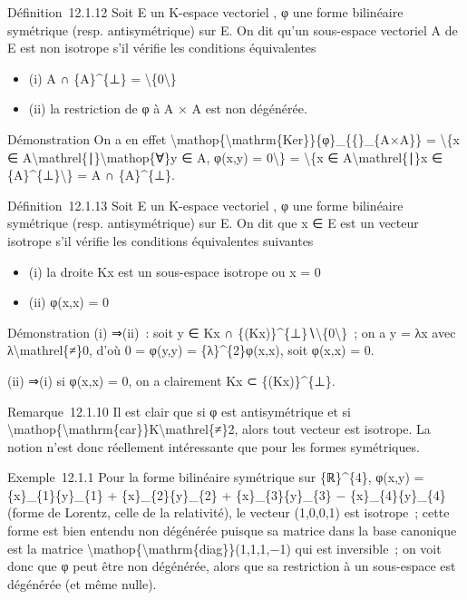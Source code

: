 \documentclass[]{article}
\begin{document}
Définition~12.1.12 Soit E un K-espace vectoriel , φ une forme bilinéaire
symétrique (resp. antisymétrique) sur E. On dit qu'un sous-espace
vectoriel A de E est non isotrope s'il vérifie les conditions
équivalentes

\begin{itemize}
\itemsep1pt\parskip0pt
\item
  (i) A ∩ \{A\}\^{}\{⊥\} = \textbackslash{}\{0\textbackslash{}\}
\item
  (ii) la restriction de φ à A × A est non dégénérée.
\end{itemize}

Démonstration On a en effet
\textbackslash{}mathop\{\textbackslash{}mathrm\{Ker\}\}\{φ\}\_\{\{\textbar{}\}\_\{A×A\}\}
= \textbackslash{}\{x ∈
A\textbackslash{}mathrel\{∣\}\textbackslash{}mathop\{∀\}y ∈ A, φ(x,y) =
0\textbackslash{}\} = \textbackslash{}\{x ∈
A\textbackslash{}mathrel\{∣\}x ∈ \{A\}\^{}\{⊥\}\textbackslash{}\} = A ∩
\{A\}\^{}\{⊥\}.

Définition~12.1.13 Soit E un K-espace vectoriel , φ une forme bilinéaire
symétrique (resp. antisymétrique) sur E. On dit que x ∈ E est un vecteur
isotrope s'il vérifie les conditions équivalentes suivantes

\begin{itemize}
\itemsep1pt\parskip0pt
\item
  (i) la droite Kx est un sous-espace isotrope ou x = 0
\item
  (ii) φ(x,x) = 0
\end{itemize}

Démonstration (i) ⇒(ii)~: soit y ∈ Kx ∩
\{(Kx)\}\^{}\{⊥\}∖\textbackslash{}\{0\textbackslash{}\}~; on a y = λx
avec λ\textbackslash{}mathrel\{≠\}0, d'où 0 = φ(y,y) =
\{λ\}\^{}\{2\}φ(x,x), soit φ(x,x) = 0.

(ii) ⇒(i) si φ(x,x) = 0, on a clairement Kx ⊂ \{(Kx)\}\^{}\{⊥\}.

Remarque~12.1.10 Il est clair que si φ est antisymétrique et si
\textbackslash{}mathop\{\textbackslash{}mathrm\{car\}\}K\textbackslash{}mathrel\{≠\}2,
alors tout vecteur est isotrope. La notion n'est donc réellement
intéressante que pour les formes symétriques.

Exemple~12.1.1 Pour la forme bilinéaire symétrique sur \{ℝ\}\^{}\{4\},
φ(x,y) = \{x\}\_\{1\}\{y\}\_\{1\} + \{x\}\_\{2\}\{y\}\_\{2\} +
\{x\}\_\{3\}\{y\}\_\{3\} − \{x\}\_\{4\}\{y\}\_\{4\} (forme de Lorentz,
celle de la relativité), le vecteur (1,0,0,1) est isotrope~; cette forme
est bien entendu non dégénérée puisque sa matrice dans la base canonique
est la matrice
\textbackslash{}mathop\{\textbackslash{}mathrm\{diag\}\}(1,1,1,−1) qui
est inversible~; on voit donc que φ peut être non dégénérée, alors que
sa restriction à un sous-espace est dégénérée (et même nulle).
\end{document}
